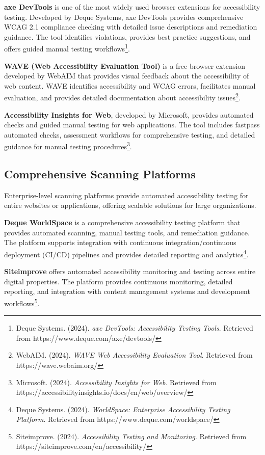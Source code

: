 \textbf{axe DevTools} is one of the most widely used browser extensions for accessibility testing. Developed by Deque Systems, axe DevTools provides comprehensive WCAG 2.1 compliance checking with detailed issue descriptions and remediation guidance. The tool identifies violations, provides best practice suggestions, and offers guided manual testing workflows\footnote{Deque Systems. (2024). \textit{axe DevTools: Accessibility Testing Tools}. Retrieved from https://www.deque.com/axe/devtools/}.

\textbf{WAVE (Web Accessibility Evaluation Tool)} is a free browser extension developed by WebAIM that provides visual feedback about the accessibility of web content. WAVE identifies accessibility and WCAG errors, facilitates manual evaluation, and provides detailed documentation about accessibility issues\footnote{WebAIM. (2024). \textit{WAVE Web Accessibility Evaluation Tool}. Retrieved from https://wave.webaim.org/}.

\textbf{Accessibility Insights for Web}, developed by Microsoft, provides automated checks and guided manual testing for web applications. The tool includes fastpass automated checks, assessment workflows for comprehensive testing, and detailed guidance for manual testing procedures\footnote{Microsoft. (2024). \textit{Accessibility Insights for Web}. Retrieved from https://accessibilityinsights.io/docs/en/web/overview/}.

\subsection{Comprehensive Scanning Platforms}

Enterprise-level scanning platforms provide automated accessibility testing for entire websites or applications, offering scalable solutions for large organizations.

\textbf{Deque WorldSpace} is a comprehensive accessibility testing platform that provides automated scanning, manual testing tools, and remediation guidance. The platform supports integration with continuous integration/continuous deployment (CI/CD) pipelines and provides detailed reporting and analytics\footnote{Deque Systems. (2024). \textit{WorldSpace: Enterprise Accessibility Testing Platform}. Retrieved from https://www.deque.com/worldspace/}.

\textbf{Siteimprove} offers automated accessibility monitoring and testing across entire digital properties. The platform provides continuous monitoring, detailed reporting, and integration with content management systems and development workflows\footnote{Siteimprove. (2024). \textit{Accessibility Testing and Monitoring}. Retrieved from https://siteimprove.com/en/accessibility/}.

